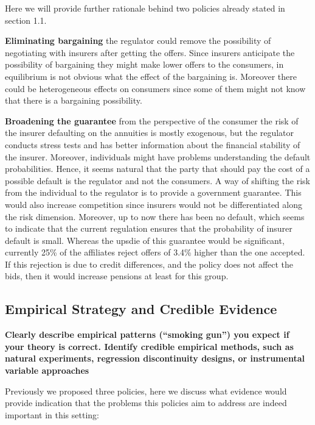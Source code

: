 \documentclass[12pt]{article}
\theoremstyle{plain}
\theoremstyle{plain}
\begin{document}
Here we will provide further rationale behind two policies already stated in  section 1.1. 

\textbf{Eliminating bargaining} the regulator could remove the possibility of negotiating with insurers after getting the offers. Since insurers anticipate the possibility of bargaining they might make lower offers to the consumers, in equilibrium is not obvious what the effect of the bargaining is. Moreover there could be heterogeneous effects on consumers since some of them might not know that there is a bargaining possibility. 

\textbf{Broadening the guarantee} from the perspective of the consumer the risk of the insurer defaulting on the annuities is mostly exogenous, but the regulator conducts stress tests and has better information about the financial stability of the insurer. Moreover, individuals might have problems understanding the default probabilities.  Hence, it seems natural that the party that should pay the cost of a possible default is the regulator and not the consumers. A way of shifting the risk from the individual to the regulator is to provide a government guarantee. This would also increase competition since insurers would not be differentiated along the risk dimension. Moreover, up to now there has been no default, which seems to indicate that the current regulation ensures that the probability of insurer default is small. Whereas the upsdie of this guarantee would be significant, currently 25\% of the affiliates reject offers of 3.4\% higher than the one accepted. If this rejection is due to credit differences, and the policy does not affect the bids,  then it would increase pensions at least for this group. 




 

\subsection{ Empirical Strategy and Credible Evidence}

\textbf{Clearly describe empirical patterns (“smoking gun”) you expect if your theory is correct. Identify credible empirical methods, such as natural experiments, regression discontinuity designs, or instrumental variable approaches}

Previously we proposed three policies, here we discuss what evidence would provide indication that the problems this policies aim to address are indeed important in this setting: 
\end{document}
